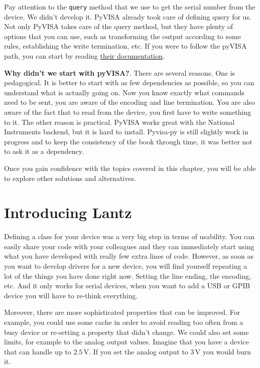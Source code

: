 Pay attention to the \texttt{query} method that we use to get the serial number from the device. We didn't develop it. PyVISA already took care of defining query for us. Not only PyVISA takes care of the query method, but they have plenty of options that you can use, such as transforming the output according to some rules, establishing the write termination, etc. If you were to follow the pyVISA path, you can start by reading \href{https://pyvisa.readthedocs.io/en/master/index.html}{their documentation}.

\textbf{Why didn't we start with pyVISA?}. There are several reasons. One is pedagogical. It is better to start with as few dependencies as possible, so you can understand what is actually going on. Now you know exactly what commands need to be sent, you are aware of the encoding and line termination. You are also aware of the fact that to read from the device, you first have to write something to it. The other reason is practical. PyVISA works great with the National Instruments backend, but it is hard to install. Pyvisa-py is still slightly work in progress and to keep the consistency of the book through time, it was better not to ask it as a dependency. 

Once you gain confidence with the topics covered in this chapter, you will be able to explore other solutions and alternatives.

\section{Introducing Lantz}\label{section:lantz}
Defining a class for your device was a very big step in terms of
usability. You can easily share your code with your colleagues and
they can immediately start using what you have developed with really few extra lines of code. However, as soon as you want to develop drivers for a new
device, you will find yourself repeating a lot of the things you have
done right now. Setting the line ending, the encoding, etc. And it only
works for serial devices, when you want to add a {USB} or {GPIB} device
you will have to re-think everything.

Moreover, there are more sophisticated properties that can be improved.
For example, you could use some cache in order to avoid reading too
often from a busy device or re-setting a property that didn't change. We
could also set some limits, for example to the analog output values. Imagine that you have a device that can handle up to $2.5\,\textrm{V}$. If you set the analog output to
$3\,\textrm{V}$ you would burn it. 

